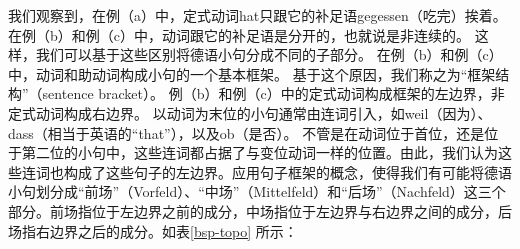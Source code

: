 我们观察到，在例（a）中，定式动词hat只跟它的补足语gegessen（吃完）挨着。在例（b）和例（c）中，动词跟它的补足语是分开的，也就说是非连续的。
这样，我们可以基于这些区别将德语小句分成不同的子部分。
在例（b）和例（c）中，动词和助动词构成小句的一个基本框架。
基于这个原因，我们称之为“框架结构”（sentence bracket）。
例（b）和例（c）中的定式动词构成框架的左边界，非定式动词构成右边界。
以动词为末位的小句通常由连词引入，如weil（因为）、dass（相当于英语的“that”），以及ob（是否）。
不管是在动词位于首位，还是位于第二位的小句中，这些连词都占据了与变位动词一样的位置。由此，我们认为这些连词也构成了这些句子的左边界。应用句子框架的概念，使得我们有可能将德语小句划分成“前场”（Vorfeld）、“中场”（Mittelfeld）和“后场”（Nachfeld）这三个部分。前场指位于左边界之前的成分，中场指位于左边界与右边界之间的成分，后场指右边界之后的成分。如表\vref{bsp-topo} 所示：
%
